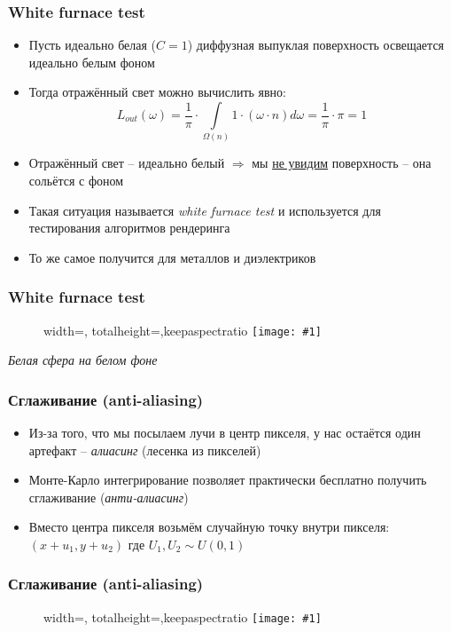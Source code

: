 \documentclass[handout,10pt]{beamer}
\newcommand{\slideimage}[1]{
  \begin{figure}
    \begin{adjustbox}{width=\textwidth, totalheight=\textheight-2\baselineskip-2\baselineskip,keepaspectratio}
      \texttt{[image: \#1]}
    \end{adjustbox}
  \end{figure}
}
\begin{document}
\begin{frame}[fragile]
\frametitle{White furnace test}
\begin{itemize}
\item Пусть идеально белая (\begin{math}C = 1\end{math}) диффузная выпуклая поверхность освещается идеально белым фоном
\pause
\item Тогда отражённый свет можно вычислить явно:
\begin{equation*}
L_{out}(\omega) = \frac{1}{\pi} \cdot \int\limits_{\Omega(n)} 1\cdot(\omega\cdot n) d\omega = \frac{1}{\pi} \cdot \pi = 1
\end{equation*}
\pause
\item Отражённый свет -- идеально белый \begin{math}\Longrightarrow\end{math} мы \underline{не увидим} поверхность -- она сольётся с фоном
\pause
\item Такая ситуация называется \textit{white furnace test} и используется для тестирования алгоритмов рендеринга
\pause
\item То же самое получится для металлов и диэлектриков
\end{itemize}
\end{frame}

\begin{frame}[fragile]
\frametitle{White furnace test}
\slideimage{white_furnace.png}
\begin{center}\textit{Белая сфера на белом фоне}\end{center}
\end{frame}

\begin{frame}[fragile]
\frametitle{Сглаживание (anti-aliasing)}
\begin{itemize}
\item Из-за того, что мы посылаем лучи в центр пикселя, у нас остаётся один артефакт -- \textit{алиасинг} (лесенка из пикселей)
\pause
\item Монте-Карло интегрирование позволяет практически бесплатно получить сглаживание (\textit{анти-алиасинг})
\pause
\item Вместо центра пикселя возьмём случайную точку внутри пикселя: \begin{math}(x+u_1,y+u_2)\end{math} где \begin{math}U_1, U_2 \sim U(0,1)\end{math}
\end{itemize}
\end{frame}

\begin{frame}[fragile]
\frametitle{Сглаживание (anti-aliasing)}
\slideimage{antialiasing.png}
\end{frame}
\end{document}
